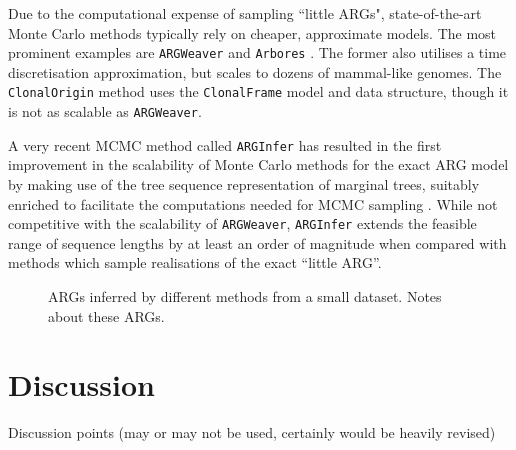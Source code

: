 \documentclass{article}
\begin{document}
Due to the computational expense of sampling ``little ARGs", state-of-the-art
Monte Carlo methods typically rely on cheaper, approximate models.
The most prominent examples are \texttt{ARGWeaver} \citep{rasmussen2014genome}
and \texttt{Arbores} \citep{heine2018bridging}. The former also utilises a time
discretisation approximation, but scales to dozens of mammal-like genomes.
The \texttt{ClonalOrigin} method \citep{didelot2010inference,
medina2020speeding} uses the \texttt{ClonalFrame}
model and data structure, though it is not as scalable as \texttt{ARGWeaver}.

A very recent MCMC method called \texttt{ARGInfer} has resulted in the first
improvement in the scalability of Monte Carlo methods for the exact ARG model
by making use of the tree sequence representation of marginal trees, suitably enriched
to facilitate the computations needed for MCMC sampling \citep{mahmoudi2021inference}.
While not competitive with the scalability of \texttt{ARGWeaver}, \texttt{ARGInfer} extends
the feasible range of sequence lengths by at least an order of magnitude when
compared with methods which sample realisations of the exact ``little ARG''.


\begin{figure}
\vspace{5em}
\caption{\label{fig-inferred-args}
ARGs inferred by different methods from a small dataset. Notes about these
ARGs.
}
\end{figure}

\section*{Discussion}

Discussion points (may or may not be used, certainly would be heavily revised)
\end{document}
